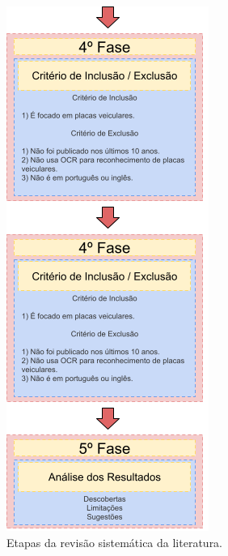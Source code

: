 \documentclass[conference]{IEEEtran}
\begin{document}
\begin{figure}[htbp]
	\centerline{\includegraphics{img2.png}}
	\caption{Etapas da revisão sistemática da literatura.}
	\label{img2}
\end{figure}
\end{document}
